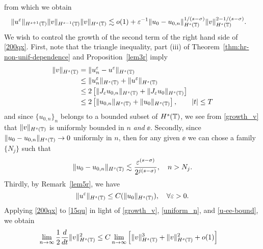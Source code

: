 from which we obtain
\begin{equation}
\begin{split}
\label{200qx}
\|u^\varepsilon\|_{H^{s+1}(\mathbb{T})} \|v\|_{H^{s-1}(\mathbb{T})} \|v \|_{H^s(\mathbb{T})}
& \lesssim  o(1) + \varepsilon^{-1}
\|u_0-u_{0,n}\|_{H^s(\mathbb{T})}^{1/(s-\sigma)}\|v\|_{H^s(\mathbb{T})}^{2- 1/(s-\sigma)}.
\end{split}
\end{equation}
We wish to control the growth of the second term of the
right hand side of \eqref{200qx}.
First, note that the triangle inequality, part (iii) of Theorem~\ref{thm:hr-non-unif-dependence} and Proposition~\ref{lem3r} imply
\begin{equation}
\begin{split}
\|v\|_{H^s(\mathbb{T})} & = \|u^\varepsilon_n - u^\varepsilon \|_{H^s(\mathbb{T})} 
\\
& \le \|u^\varepsilon_n\|_{H^s(\mathbb{T})} + \|u^\varepsilon \|_{H^s(\mathbb{T})}  
\\
& \le 2\left[  \|J_\varepsilon u_{0,n}\|_{H^s(\mathbb{T})} + \|J_\varepsilon u_0 \|_{H^s(\mathbb{T})} 
\right]
\\
& \le 2 \left[ \|u_{0,n} \|_{H^s(\mathbb{T})} + \|u_0 \|_{H^s(\mathbb{T})} 
\right], \qquad |t| \le T
\label{growth_v}
\end{split}
\end{equation}
and since $\{u_{0,n}\}_n$ belongs to a bounded subset of
$H^s(\mathbb{T})$, we see from \eqref{growth_v} that $\|v \|_{H^s(\mathbb{T})}$ is
uniformly bounded in $n$ \emph{and} $\ee$.  Secondly, since $\|u_0 -
u_{0,n} \|_{H^s(\mathbb{T})} \to 0$ uniformly in $n$, then for any given $\ee$ we
can chose a family $\{N_j\} $ such that
\begin{equation}
\begin{split}
\|u_0 - u_{0,n} \|_{H^s(\mathbb{T})} \lesssim
\frac{\varepsilon^{(s-\sigma)}}{2^{j(s -\sigma)}}, \quad n >
N_j.
\label{uniform_n}
\end{split}
\end{equation}
Thirdly, by Remark~\ref{lem5r}, we have 
\begin{equation}
\label{u-ee-bound}
\|u^\varepsilon \|_{H^s(\mathbb{T})} \le C(\|u_0\|_{H^s(\mathbb{T})}), \quad \forall \varepsilon > 0.
\end{equation}
Applying \eqref{200qx} to \eqref{15qu} in light of 
\eqref{growth_v}, \eqref{uniform_n}, and \eqref{u-ee-bound}, we obtain
\begin{equation*}
\begin{split}
\lim_{n \to \infty }
\frac{1}{2}\frac{d}{dt}\|v\|_{H^{s}(\mathbb{T})}^2
& \le
C \lim_{n \to \infty} \Big [\|v\|_{H^s(\mathbb{T})}^3 +
\|v\|_{H^s(\mathbb{T})}^2 + o(1)\Big ]
\end{split}
\end{equation*}
